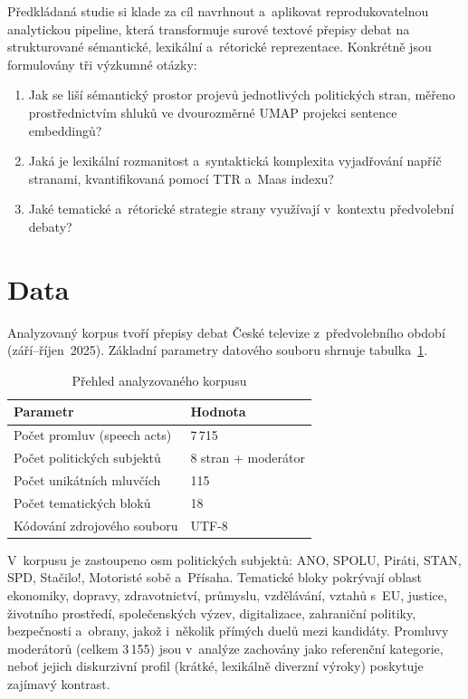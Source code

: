 \documentclass[12pt, a4paper]{article}
\begin{document}
Předkládaná studie si klade za cíl navrhnout a~aplikovat reprodukovatelnou
analytickou pipeline, která transformuje surové textové přepisy debat na strukturované
sémantické, lexikální a~rétorické reprezentace. Konkrétně jsou formulovány
tři výzkumné otázky:

\begin{enumerate}
  \item Jak se liší sémantický prostor projevů jednotlivých politických
        stran, měřeno prostřednictvím shluků ve dvourozměrné UMAP projekci
        sentence embeddingů?
  \item Jaká je lexikální rozmanitost a~syntaktická komplexita vyjadřování
        napříč stranami, kvantifikovaná pomocí TTR a~Maas indexu?
  \item Jaké tematické a~rétorické strategie strany využívají v~kontextu
        předvolební debaty?
\end{enumerate}

\section{Data}
\label{sec:data}

Analyzovaný korpus tvoří přepisy debat České televize
z~předvolebního období (září--říjen~2025). Základní parametry
datového souboru shrnuje tabulka~\ref{tab:dataset}.

\begin{table}[H]
  \centering
  \caption{Přehled analyzovaného korpusu}
  \label{tab:dataset}
  \begin{tabular}{ll}
    \toprule
    \textbf{Parametr}        & \textbf{Hodnota} \\
    \midrule
    Počet promluv (speech acts)   & 7\,715 \\
    Počet politických subjektů    & 8 stran + moderátor \\
    Počet unikátních mluvčích     & 115 \\
    Počet tematických bloků       & 18 \\
    Kódování zdrojového souboru   & UTF-8 \\
    \bottomrule
  \end{tabular}
\end{table}

V~korpusu je zastoupeno osm politických subjektů: ANO, SPOLU, Piráti, STAN,
SPD, Stačilo!, Motoristé sobě a~Přísaha. Tematické bloky pokrývají oblast
ekonomiky, dopravy, zdravotnictví, průmyslu, vzdělávání, vztahů s~EU,
justice, životního prostředí, společenských výzev, digitalizace, zahraniční
politiky, bezpečnosti a~obrany, jakož i~několik přímých duelů mezi
kandidáty. Promluvy moderátorů (celkem 3\,155) jsou v~analýze zachovány jako
referenční kategorie, neboť jejich diskurzivní profil (krátké, lexikálně
diverzní výroky) poskytuje zajímavý kontrast.
\end{document}
